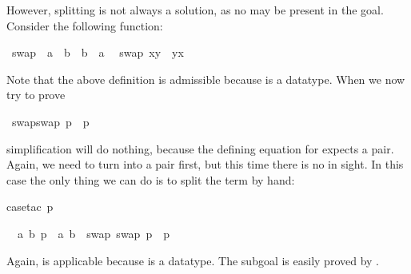 \begin{isabellebody}
\begin{isamarkuptxt}
However, splitting  is not always a solution, as no 
may be present in the goal. Consider the following function:%
\end{isamarkuptxt}%
\ swap\ {\isacharcolon}{\isacharcolon}\ {\isachardoublequote}{\isacharprime}a\ {\isasymtimes}\ {\isacharprime}b\ {\isasymRightarrow}\ {\isacharprime}b\ {\isasymtimes}\ {\isacharprime}a{\isachardoublequote}\isanewline
{}\isanewline
\ \ {\isachardoublequote}swap\ {\isacharparenleft}x{\isacharcomma}y{\isacharparenright}\ {\isacharequal}\ {\isacharparenleft}y{\isacharcomma}x{\isacharparenright}{\isachardoublequote}%
\begin{isamarkuptext}%
\noindent
Note that the above  definition is admissible
because \isa{{\isasymtimes}} is a datatype. When we now try to prove%
\end{isamarkuptext}%
\ {\isachardoublequote}swap{\isacharparenleft}swap\ p{\isacharparenright}\ {\isacharequal}\ p{\isachardoublequote}%
\begin{isamarkuptxt}%
\noindent
simplification will do nothing, because the defining equation for 
expects a pair. Again, we need to turn  into a pair first, but this
time there is no  in sight. In this case the only thing we can do
is to split the term by hand:%
\end{isamarkuptxt}%
case{\isacharunderscore}tac\ p{\isacharparenright}%
\begin{isamarkuptxt}%
\noindent
\begin{isabelle}%
\ {}{\isachardot}\ {\isasymAnd}a\ b{\isachardot}\ p\ {\isacharequal}\ {\isacharparenleft}a{\isacharcomma}\ b{\isacharparenright}\ {\isasymLongrightarrow}\ swap\ {\isacharparenleft}swap\ p{\isacharparenright}\ {\isacharequal}\ p%
\end{isabelle}
Again,  is applicable because \isa{{\isasymtimes}} is a datatype.
The subgoal is easily proved by .


\end{isamarkuptxt}
\end{isabellebody}
